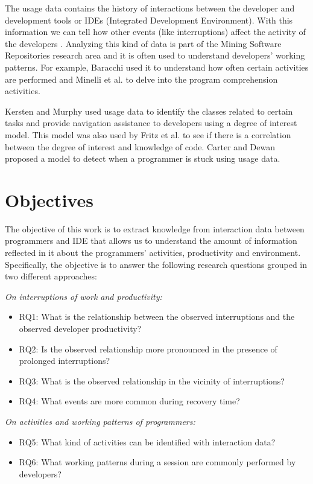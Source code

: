 The usage data contains the history of interactions between the developer and development tools or IDEs (Integrated Development Environment). With this information we can tell how other events (like interruptions) affect the activity of the developers \cite{SnipesETALASD}. Analyzing this kind of data is part of the Mining Software Repositories research area \cite{H04} and it is often used to understand developers' working patterns. For example, Baracchi \cite{B14} used it to understand how often certain activities are performed and Minelli et al. \cite{MMLK14} to delve into the program comprehension activities.

Kersten and Murphy \cite{KM06} used usage data to identify the classes related to certain tasks and provide navigation assistance to developers using a degree of interest model. This model was also used by Fritz et al. \cite{FMH07} to see if there is a correlation between the degree of interest and knowledge of code. Carter and Dewan \cite{CD10} proposed a model to detect when a programmer is stuck using usage data.



\section{Objectives}
The objective of this work is to extract knowledge from interaction data between programmers and IDE that allows us to understand the amount of information reflected in it about the programmers' activities, productivity and environment. Specifically, the objective is to answer the following research questions grouped in two different approaches: 

\emph{On interruptions of work and productivity:}
\begin{itemize}
	\item RQ1: What is the relationship between the observed interruptions and the observed developer productivity?
	\item RQ2: Is the observed relationship more pronounced in the presence of prolonged interruptions?
	\item RQ3: What is the observed relationship in the vicinity of interruptions?
	\item RQ4: What events are more common during recovery time?
\end{itemize}

\emph{On activities and working patterns of programmers:}
\begin{itemize}
	\item RQ5: What kind of activities can be identified with interaction data?
	\item RQ6: What working patterns during a session are commonly performed by developers?
\end{itemize}

